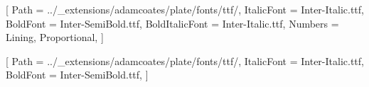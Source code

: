 \setmainfont{Inter-Regular.ttf}[
  Path = ../_extensions/adamcoates/plate/fonts/ttf/,
  ItalicFont = Inter-Italic.ttf,
  BoldFont = Inter-SemiBold.ttf,
  BoldItalicFont = Inter-Italic.ttf,
  Numbers = {Lining, Proportional},
]

\setsansfont{Inter-Regular.ttf}[
  Path = ../_extensions/adamcoates/plate/fonts/ttf/,
  ItalicFont = Inter-Italic.ttf,
  BoldFont = Inter-SemiBold.ttf,
]

%
%
\usepackage{fontawesome5}

%

